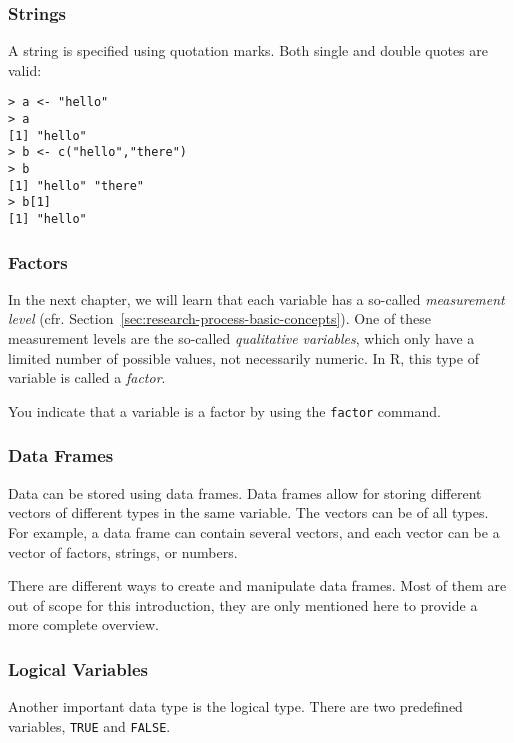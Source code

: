 \subsubsection{Strings}

A string is specified using quotation marks. Both single and double quotes are valid:
\begin{lstlisting}
> a <- "hello"
> a
[1] "hello"
> b <- c("hello","there")
> b
[1] "hello" "there"
> b[1]
[1] "hello"
\end{lstlisting}

\subsubsection{Factors}

In the next chapter, we will learn that each variable has a so-called \textit{measurement level} (cfr. Section~\ref{sec:research-process-basic-concepts}). One of these measurement levels are the so-called \textit{qualitative variables}, which only have a limited number of possible values, not necessarily numeric. In R, this type of variable is called a \textit{factor}.

You indicate that a variable is a factor by using the \texttt{factor} command.

\subsubsection{Data Frames}

Data can be stored using data frames. Data frames allow for storing different vectors of different types in the same variable. 
The vectors can be of all types. For example, a data frame can contain several vectors, and each vector can be a vector of factors, strings, or numbers.

There are different ways to create and manipulate data frames. Most of them are out of scope for this introduction, they are only mentioned here to provide a more complete overview.



\subsubsection{Logical Variables}

Another important data type is the logical type. There are two predefined variables, \texttt{TRUE} and \texttt{FALSE}.


